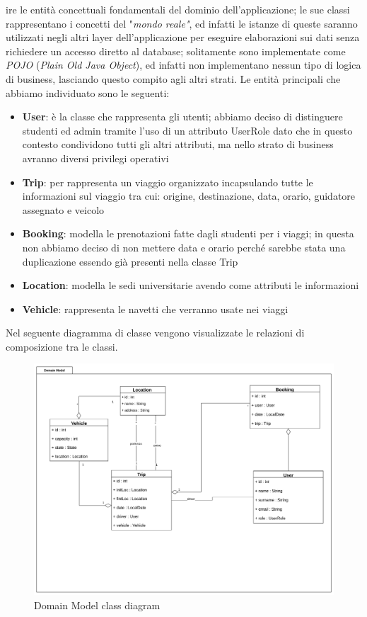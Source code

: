ire le entità concettuali fondamentali del dominio dell'applicazione; le sue classi rappresentano i concetti del "\textit{mondo reale"}, ed infatti le istanze di queste saranno utilizzati negli altri layer dell'applicazione per eseguire elaborazioni sui dati senza richiedere un accesso diretto al database; solitamente sono implementate come \textit{POJO} (\textit{Plain Old Java Object}), ed infatti non implementano nessun tipo di logica di business, lasciando questo compito agli altri strati.
Le entità principali che abbiamo individuato sono le seguenti:
\begin{itemize}
    \item \textbf{User}: è la classe che rappresenta gli utenti; abbiamo deciso di distinguere studenti ed admin tramite l'uso di un attributo UserRole dato che in questo contesto condividono  tutti gli altri attributi, ma nello strato di business avranno diversi privilegi operativi
    \item \textbf{Trip}: per rappresenta un viaggio organizzato incapsulando tutte le informazioni sul viaggio tra cui: origine, destinazione, data, orario, guidatore assegnato e veicolo
    \item \textbf{Booking}: modella le prenotazioni fatte dagli studenti per i viaggi; in questa non abbiamo deciso di non mettere data e orario perché sarebbe stata una duplicazione essendo già presenti nella classe Trip
    \item \textbf{Location}: modella le sedi universitarie avendo come attributi le informazioni
    \item \textbf{Vehicle}: rappresenta le navetti che verranno usate nei viaggi
\end{itemize}
Nel seguente diagramma di classe vengono visualizzate le relazioni di composizione tra le classi.
\begin{figure}[H]
    \centering
    \includegraphics[width=1\linewidth]{Images/DomainModel_diag.png}
    \caption{Domain Model class diagram}
    \label{fig:DMdiag}
\end{figure}
